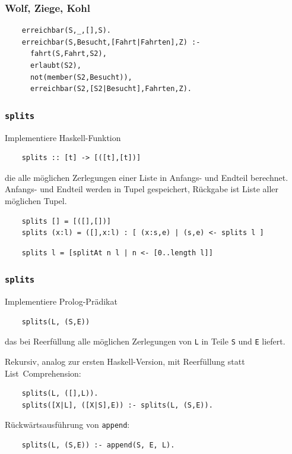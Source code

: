 \documentclass{beamer}
\begin{document}
\begin{frame}[fragile]
  \frametitle{Wolf, Ziege, Kohl}
  \begin{lstlisting}
    erreichbar(S,_,[],S).
    erreichbar(S,Besucht,[Fahrt|Fahrten],Z) :-
      fahrt(S,Fahrt,S2),
      erlaubt(S2),
      not(member(S2,Besucht)),
      erreichbar(S2,[S2|Besucht],Fahrten,Z).
  \end{lstlisting}
\end{frame}

\begin{frame}[fragile]\lstset{language=Haskell}
  \frametitle{\lstinline{splits}}
  Implementiere Haskell-Funktion
  \begin{lstlisting}
    splits :: [t] -> [([t],[t])]
  \end{lstlisting}
  die alle möglichen Zerlegungen einer Liste in Anfangs- und Endteil berechnet.
  Anfangs- und Endteil werden in Tupel gespeichert,
  Rückgabe ist Liste aller möglichen Tupel.
  \pause
  \begin{lstlisting}
    splits [] = [([],[])]
    splits (x:l) = ([],x:l) : [ (x:s,e) | (s,e) <- splits l ]
  \end{lstlisting}
  \pause
  \begin{lstlisting}
    splits l = [splitAt n l | n <- [0..length l]]
  \end{lstlisting}
\end{frame}

\begin{frame}[fragile]
  \frametitle{\lstinline{splits}}
  Implementiere Prolog-Prädikat
  \begin{lstlisting}
    splits(L, (S,E))
  \end{lstlisting}
  das bei Reerfüllung alle möglichen Zerlegungen von \lstinline{L} in Teile \lstinline{S} und \lstinline{E} liefert.
  
  \pause
  Rekursiv, analog zur ersten Haskell-Version, mit Reerfüllung statt List~Comprehension:
  \begin{lstlisting}
    splits(L, ([],L)).
    splits([X|L], ([X|S],E)) :- splits(L, (S,E)).
  \end{lstlisting}
  
  \pause
  Rückwärtsausführung von \lstinline{append}:
  \begin{lstlisting}
    splits(L, (S,E)) :- append(S, E, L).
  \end{lstlisting}
\end{frame}
\end{document}
